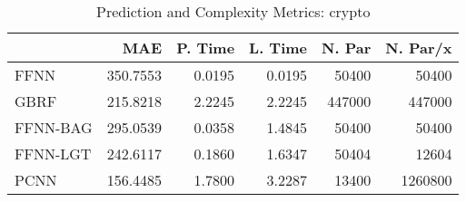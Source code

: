 \begin{table}
\centering
\caption{Prediction and Complexity Metrics: crypto}
\label{tab__crypto__Fix_Neurons_QTrue}
\begin{tabular}{lrrrrr}
\toprule
{} &      MAE &  P. Time &  L. Time &  N. Par &  N. Par/x \\
\midrule
FFNN     & 350.7553 &   0.0195 &   0.0195 &   50400 &     50400 \\
GBRF     & 215.8218 &   2.2245 &   2.2245 &  447000 &    447000 \\
FFNN-BAG & 295.0539 &   0.0358 &   1.4845 &   50400 &     50400 \\
FFNN-LGT & 242.6117 &   0.1860 &   1.6347 &   50404 &     12604 \\
PCNN     & 156.4485 &   1.7800 &   3.2287 &   13400 &   1260800 \\
\bottomrule
\end{tabular}
\end{table}
